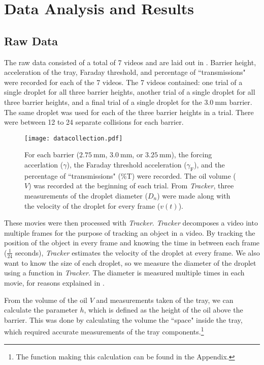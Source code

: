 \chapter{Data Analysis and Results}



\section{Raw Data}
The raw data consisted of a total of 7 videos and are laid out in . Barrier height, acceleration of the tray, Faraday threshold, and percentage of ``transmissions" were recorded for each of the 7 videos. The 7 videos contained: one trial of a single droplet for all three barrier heights, another trial of a single droplet for all three barrier heights, and a final trial of a single droplet for the $3.0~\mathrm{mm}$ barrier. The same droplet was used for each of the three barrier heights in a trial. There were between 12 to 24 separate collisions for each barrier. 

\begin{figure}[h!]
	\centering
	\texttt{[image: datacollection.pdf]}
	\caption{For each barrier ($2.75~\mathrm{mm}$, $3.0~\mathrm{mm}$, or $3.25~\mathrm{mm}$), the forcing accerlation ($\gamma$), the Faraday threshold acceleration ($\gamma_\mathrm{F}$), and the percentage of ``transmissions" (\%T) were recorded. The oil volume ($V$) was recorded at the beginning of each trial. From \textit{Tracker}, three measurements of the droplet diameter ($D_n$) were made along with the velocity of the droplet for every frame ($v(t)$).}
	\label{datacollection}
\end{figure}

These movies were then processed with \textit{Tracker}. \textit{Tracker} decomposes a video into multiple frames for the purpose of tracking an object in a video. By tracking the position of the object in every frame and knowing the time in between each frame ($\frac{1}{24}$ seconds), \textit{Tracker} estimates the velocity of the droplet at every frame. We also want to know the size of each droplet, so we measure the diameter of the droplet using a function in \textit{Tracker}. The diameter is measured multiple times in each movie, for reasons explained in .


From the volume of the oil $V$ and measurements taken of the tray, we can calculate the parameter $h$, which is defined as the height of the oil above the barrier. This was done by calculating the volume the ``space" inside the tray, which required accurate measurements of the tray components.\footnote{The function making this calculation can be found in the Appendix.}




